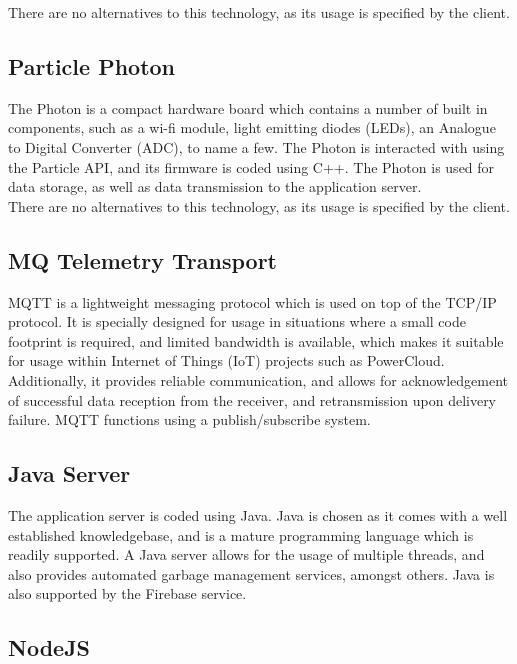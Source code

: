 \documentclass{article}
\begin{document}
	\noindent
	There are no alternatives to this technology, as its usage is 
	specified by the client.
	
	\subsection{Particle Photon}
	
	The Photon is a compact hardware board which contains a number of 
	built in components, such as a wi-fi module, light emitting diodes 
	(LEDs), an Analogue to Digital Converter (ADC), to name a few. The 
	Photon is interacted with using the Particle API, and its firmware is 
	coded using C++. The Photon is used for data storage, as well as data 
	transmission to the application server.\\
	
	\noindent
	There are no alternatives to this technology, as its usage is 
	specified by the client.
	
	\subsection{MQ Telemetry Transport}
	
	MQTT is a lightweight messaging protocol which is used on top of the 
	TCP/IP protocol. It is specially designed for usage in situations 
	where a small code footprint is required, and limited bandwidth is 
	available, which makes it suitable for usage within Internet of 
	Things (IoT) projects such as PowerCloud. Additionally, it provides 
	reliable communication, and allows for acknowledgement of successful 
	data reception from the receiver, and retransmission upon delivery 
	failure. MQTT functions using a publish/subscribe system.
	
	\subsection{Java Server}
	
	The application server is coded using Java. Java is chosen as it 
	comes with a well established knowledgebase, and is a mature 
	programming language which is readily supported. A Java server allows 
	for the usage of multiple threads, and also provides automated 
	garbage management services, amongst others. Java is also supported 
	by the Firebase service.
	
	\subsection{NodeJS}
	
\end{document}
